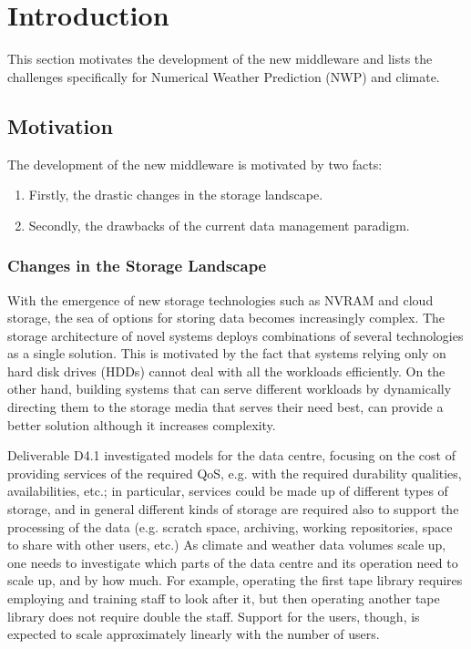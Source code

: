 \documentclass{../../template/esiwace-report}
\begin{document}
\chapter{Introduction}

\begin{chapterIntro}
This section motivates the development of the new middleware and lists the challenges specifically for Numerical Weather Prediction (NWP) and climate.
\end{chapterIntro}

\section{Motivation}

The development of the new middleware is motivated by two facts:

\begin{enumerate}
	\item Firstly, the drastic changes in the storage landscape.
	\item Secondly, the drawbacks of the current data management paradigm.
\end{enumerate}


\subsection{Changes in the Storage Landscape}

With the emergence of new storage technologies such as NVRAM and cloud storage, the sea of options for storing data becomes increasingly complex.
The storage architecture of novel systems deploys combinations of several technologies as a single solution. This is motivated by the fact that systems
relying only on hard disk drives (HDDs) cannot deal with all the workloads efficiently. On the other hand, building systems that can serve different 
workloads by dynamically directing them to the storage media that serves their need best, can provide a better solution although it increases complexity.

Deliverable D4.1 investigated models for the data centre, focusing on the cost of providing services of the required QoS, e.g. with the required durability qualities, availabilities, etc.; in particular, services could be made up of different types of storage, and in general different kinds of storage are required also to support the processing of the data (e.g. scratch space, archiving, working repositories, space to share with other users, etc.)  As climate and weather data volumes scale up, one needs to investigate which parts of the data centre and its operation need to scale up, and by how much.  For example, operating the first tape library requires employing and training staff to look after it, but then operating another tape library does not require double the staff.  Support for the users, though, is expected to scale approximately linearly with the number of users.
\end{document}
